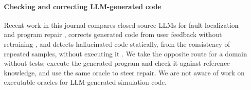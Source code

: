 \paragraph{Checking and correcting LLM-generated code} Recent work in this journal compares closed-source LLMs for fault localization and program repair \citep{wang2025closedapr}, corrects generated code from user feedback without retraining \citep{le2024oneshot}, and detects hallucinated code statically, from the consistency of repeated samples, without executing it \citep{huang2026hallucodedetector}. We take the opposite route for a domain without tests: execute the generated program and check it against reference knowledge, and use the same oracle to steer repair. We are not aware of work on executable oracles for LLM-generated simulation code.
